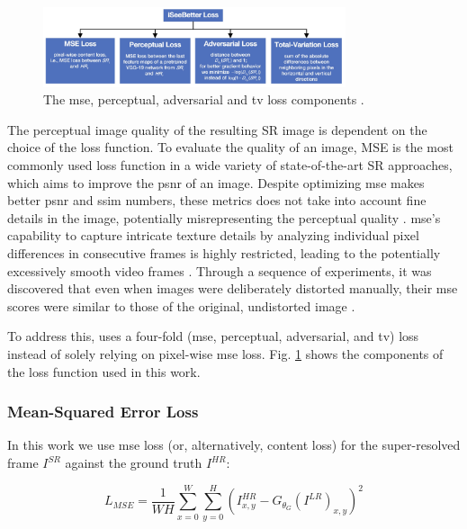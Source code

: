 \documentclass[conference]{IEEEtran}
\begin{document}
\begin{figure}[t]
	\centering
    \centerline{\includegraphics[width=8.9cm]{loss}}
	\caption{The \acrshort{mse}, perceptual, adversarial and \acrshort{tv} loss components \cite{iSeeBetter_2020}.}
	\label{fig:loss}
\end{figure}

The perceptual image quality of the resulting SR image is dependent on the choice of the loss function. To evaluate the quality of an image, MSE is the most commonly used loss function in a wide variety of state-of-the-art SR approaches, which aims to improve the \acrshort{psnr} of an image. Despite optimizing \acrshort{mse} makes better \acrshort{psnr} and \acrshort{ssim} numbers, these metrics does not take into account fine details in the image, potentially misrepresenting the perceptual quality \cite{iSeeBetter_2020}. \acrshort{mse}'s capability to capture intricate texture details by analyzing individual pixel differences in consecutive frames is highly restricted, leading to the potentially excessively smooth video frames \cite{fast_video_super_reso_ann_2012}. Through a sequence of experiments, it was discovered that even when images were deliberately distorted manually, their \acrshort{mse} scores were similar to those of the original, undistorted image \cite{universal_image_quality_index_2002}.

To address this, \cite{iSeeBetter_2020} uses a four-fold (\acrlong{mse}, perceptual, adversarial, and \acrlong{tv}) loss instead of solely relying on pixel-wise \acrshort{mse} loss. Fig. \ref{fig:loss} shows the components of the loss function used in this work.

\subsubsection{Mean-Squared Error Loss}

In this work we use \acrshort{mse} loss (or, alternatively, content loss) for the super-resolved frame $I^{SR}$ against the ground truth $I^{HR}$:

\begin{equation} \label{eq:mse_loss}
	L_{MSE} = \frac{1}{WH} \sum_{x=0}^{W} \sum_{y=0}^{H} ( I^{HR}_{x,y} - G_{\theta_G} (I^{LR})_{x,y} )^2
\end{equation}
\end{document}
